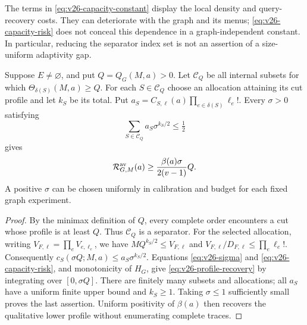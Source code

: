 The terms in \eqref{eq:v26-capacity-constant} display the local density
and query-recovery costs. They can deteriorate with the graph and its
menus; \eqref{eq:v26-capacity-risk} does not conceal this dependence
in a graph-independent constant. In particular, reducing the separator
index set is not an assertion of a size-uniform adaptivity gap.

\begin{corollary}
\label{cor:v26-profile-recovery}
Suppose $E\ne\varnothing$, and put $Q=Q_G(M,a)>0$.
Let $\mathcal C_Q$ be all internal subsets for which
$\Theta_{\delta(S)}(M,a)\ge Q$. For each $S\in\mathcal C_Q$ choose
an allocation attaining its cut profile and let $k_S$ be its total.
Put $a_S=C_{S,\ell}(a)\prod_{e\in\delta(S)}\ell_e!$.
Every $\sigma>0$ satisfying
\begin{equation}\label{eq:v26-sigma}
             \sum_{S\in\mathcal C_Q}a_S\sigma^{k_S/2}\le\tfrac12
\end{equation}
gives
\begin{equation}\label{eq:v26-profile-recovery}
       \mathcal R^{\rm av}_{G,M}(a)
                     \ge\frac{\beta(a)\sigma}{2(v-1)}Q.
\end{equation}
A positive $\sigma$ can be chosen uniformly in calibration and budget
for each fixed graph experiment.
\end{corollary}
\begin{proof}
By the minimax definition of $Q$, every complete order encounters a cut
whose profile is at least $Q$. Thus $\mathcal C_Q$ is a separator.
For the selected allocation, writing $V_{F,\ell}=\prod_eV_{e,\ell_e}$,
we have $MQ^{k_S/2}\le V_{F,\ell}$ and
$V_{F,\ell}/D_{F,\ell}\le\prod_e\ell_e!$.
Consequently $c_S(\sigma Q;M,a)\le a_S\sigma^{k_S/2}$.
Equations \eqref{eq:v26-sigma} and \eqref{eq:v26-capacity-risk},
and monotonicity of $H_G$, give \eqref{eq:v26-profile-recovery}
by integrating over $[0,\sigma Q]$. There are finitely many subsets
and allocations; all $a_S$ have a uniform finite upper bound and
$k_S\ge1$. Taking $\sigma\le1$ sufficiently small proves the
last assertion. Uniform positivity of $\beta(a)$ then recovers the
qualitative lower profile without enumerating complete traces.
\end{proof}
